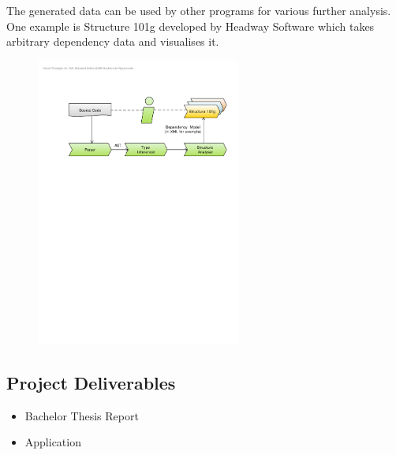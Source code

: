 \documentclass[10pt,halfparskip,DIV15]{scrartcl}
\begin{document}
The generated data can be used by other programs for various further analysis. One example is Structure 101g developed by Headway Software which takes arbitrary dependency data and visualises it. 

\vspace{-0.1cm}

\begin{figure}[h] \centering
\includegraphics[width=0.6\textwidth]{big_picture}
\end{figure}

\vspace{-0.7cm}

\subsection*{Project Deliverables}

\begin{itemize}
	\item Bachelor Thesis Report
	\item Application
\end{itemize}
\end{document}
